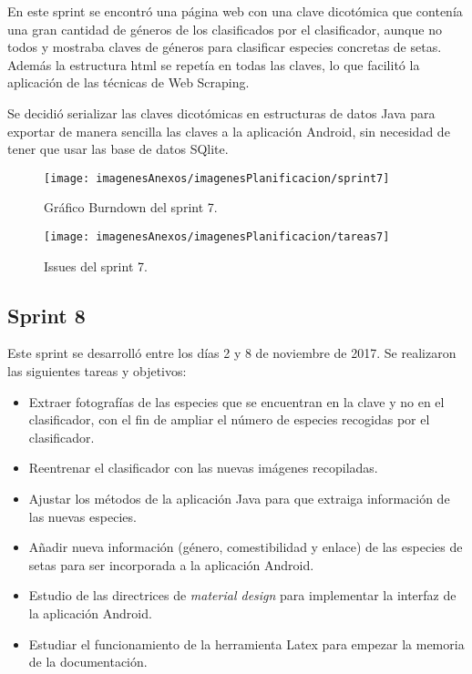 En este sprint se encontró una página web con una clave dicotómica que contenía una gran cantidad de géneros de los clasificados por el clasificador, aunque no todos y mostraba claves de géneros para clasificar especies concretas de setas. Además la estructura html se repetía en todas las claves, lo que facilitó la aplicación de las técnicas de Web Scraping.

Se decidió serializar las claves dicotómicas en estructuras de datos Java para exportar de manera sencilla las claves a la aplicación Android, sin necesidad de tener que usar las base de datos SQlite.

\begin{figure}[h]
    \begin{center}%
        \begin{center}%
          \texttt{[image: imagenesAnexos/imagenesPlanificacion/sprint7]}%
          \caption{Gráfico Burndown del sprint 7.}%
          \label{figSprint7}%
        \end{center}%
  	\end{center}%
\end{figure}%

\begin{figure}[h]
    \begin{center}%
        \begin{center}%
          \texttt{[image: imagenesAnexos/imagenesPlanificacion/tareas7]}%
          \caption{Issues del sprint 7.}%
          \label{figTareas7}%
        \end{center}%
  	\end{center}%
\end{figure}%

\newpage

\subsection{Sprint 8}

Este sprint se desarrolló entre los días 2 y 8 de noviembre de 2017. Se realizaron las siguientes tareas y objetivos:

\begin{itemize}
	\item Extraer fotografías de las especies que se encuentran en la clave y no en el clasificador, con el fin de ampliar el número de especies recogidas por el clasificador.
	\item Reentrenar el clasificador con las nuevas imágenes recopiladas.
	\item Ajustar los métodos de la aplicación Java para que extraiga información de las nuevas especies.
	\item Añadir nueva información (género, comestibilidad y enlace) de las especies de setas para ser incorporada a la aplicación Android.
	\item Estudio de las directrices de \textit{material design} para implementar la interfaz de la aplicación Android.
	\item Estudiar el funcionamiento de la herramienta Latex para empezar la memoria de la documentación.
\end{itemize}

